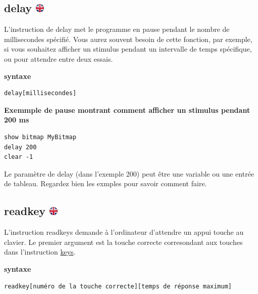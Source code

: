 \documentclass[
]{book}
\begin{document}
\hypertarget{delay}{%
\subsection[delay ]{\texorpdfstring{delay \href{https://www.psytoolkit.org/doc3.4.0/syntax.html\#task-delay}{\protect\includegraphics{img/ukflag.png}}}{delay }}\label{delay}}

L'instruction de delay met le programme en pause pendant le nombre de millisecondes spécifié. Vous aurez souvent besoin de cette fonction, par exemple, si vous souhaitez afficher un stimulus pendant un intervalle de temps spécifique, ou pour attendre entre deux essais.

\textbf{syntaxe}

\begin{verbatim}
delay[millisecondes]
\end{verbatim}

\textbf{Exemmple de pause montrant comment afficher un stimulus pendant 200 ms}

\begin{verbatim}
show bitmap MyBitmap
delay 200
clear -1
\end{verbatim}

Le paramètre de delay (dans l'exemple 200) peut être une variable ou une entrée de tableau. Regardez bien les exmples pour savoir comment faire.

\hypertarget{readkey}{%
\subsection[readkey ]{\texorpdfstring{readkey \href{https://www.psytoolkit.org/doc3.4.0/syntax.html\#task-readkey}{\protect\includegraphics{img/ukflag.png}}}{readkey }}\label{readkey}}

L'instruction readkeys demande à l'ordinateur d'attendre un appui touche au clavier. Le premier argument est la touche correcte corresondant aux touches dans l'instruction \protect\hyperlink{keys}{keys}.

\textbf{syntaxe}

\begin{verbatim}
readkey[numéro de la touche correcte][temps de réponse maximum]
\end{verbatim}
\end{document}
